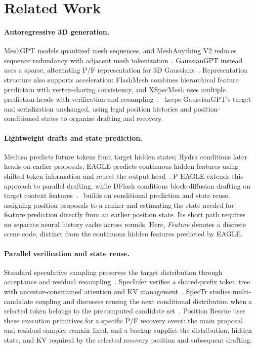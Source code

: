 \section{Related Work}
\label{sec:related}
\paragraph{Autoregressive 3D generation.}
MeshGPT models quantized mesh sequences, and MeshAnything V2 reduces sequence redundancy with adjacent mesh tokenization~\cite{meshgpt,meshanything}. GaussianGPT instead uses a sparse, alternating P/F representation for 3D Gaussians~\cite{gaussiangpt}. Representation structure also supports acceleration: FlashMesh combines hierarchical feature prediction with vertex-sharing consistency, and XSpecMesh uses multiple prediction heads with verification and resampling~\cite{flashmesh,xspecmesh}. \PF\ keeps GaussianGPT's target and serialization unchanged, using legal position histories and position-conditioned states to organize drafting and recovery.

\paragraph{Lightweight drafts and state prediction.}
Medusa predicts future tokens from target hidden states; Hydra conditions later heads on earlier proposals; EAGLE predicts continuous hidden features using shifted token information and reuses the output head~\cite{medusa,hydra,eagle}. P-EAGLE extends this approach to parallel drafting, while DFlash conditions block-diffusion drafting on target context features~\cite{peagle,dflash}. \PF\ builds on conditional prediction and state reuse, assigning position proposals to a ranker and estimating the state needed for feature prediction directly from an earlier position state. Its short path requires no separate neural history cache across rounds. Here, \emph{Feature} denotes a discrete scene code, distinct from the continuous hidden features predicted by EAGLE.

\paragraph{Parallel verification and state reuse.}
Standard speculative sampling preserves the target distribution through acceptance and residual resampling~\cite{leviathan}. SpecInfer verifies a shared-prefix token tree with ancestor-constrained attention and KV management~\cite{specinfer}. SpecTr studies multi-candidate coupling and discusses reusing the next conditional distribution when a selected token belongs to the precomputed candidate set~\cite{spectr}. Position Rescue uses these execution primitives for a specific P/F recovery event: the main proposal and residual sampler remain fixed, and a backup supplies the distribution, hidden state, and KV required by the selected recovery position and subsequent drafting.

